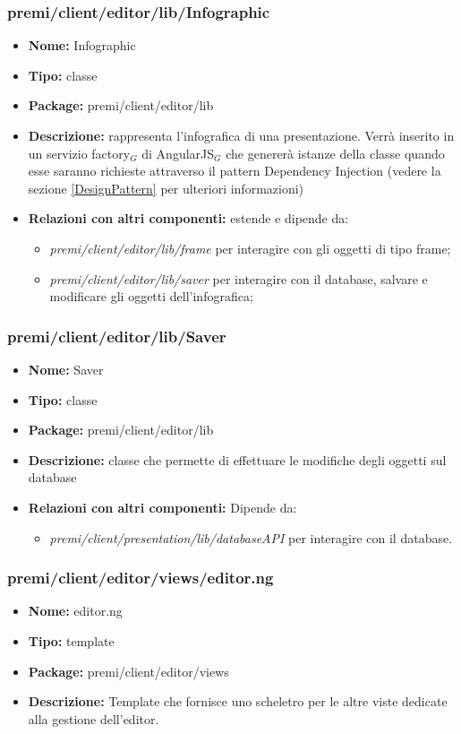 \subsubsection{premi/client/editor/lib/Infographic}
\begin{itemize}
  \item[] \textbf{Nome:} Infographic
  \item[] \textbf{Tipo:} classe
  \item[] \textbf{Package:} premi/client/editor/lib
  \item[] \textbf{Descrizione:} rappresenta l'infografica di una presentazione. Verrà inserito in un servizio factory$_G$ di AngularJS$_G$ che genererà istanze della classe quando esse saranno richieste attraverso il pattern Dependency Injection (vedere la sezione \ref{DesignPattern} per ulteriori informazioni)
  \item[] \textbf{Relazioni con altri componenti:} estende  e dipende da:
\begin{itemize} 
	\item \textit{premi/client/editor/lib/frame} per interagire con gli oggetti di tipo frame;
	\item \textit{premi/client/editor/lib/saver} per interagire con il database, salvare e modificare gli oggetti dell'infografica;
\end{itemize}  
\end{itemize}
\subsubsection{premi/client/editor/lib/Saver}
\begin{itemize}
  \item[] \textbf{Nome:} Saver
  \item[] \textbf{Tipo:} classe
  \item[] \textbf{Package:} premi/client/editor/lib
  \item[] \textbf{Descrizione:} classe che permette di effettuare le modifiche degli oggetti sul database
  \item[] \textbf{Relazioni con altri componenti:} Dipende da:
\begin{itemize} 
	\item \textit{premi/client/presentation/lib/databaseAPI} per interagire con il database.
\end{itemize}  
\end{itemize}
\subsubsection{premi/client/editor/views/editor.ng}
\begin{itemize}
  \item[] \textbf{Nome:} editor.ng
  \item[] \textbf{Tipo:} template
  \item[] \textbf{Package:} premi/client/editor/views
  \item[] \textbf{Descrizione:} Template che fornisce uno scheletro per le altre viste dedicate alla gestione dell'editor.
\end{itemize}
